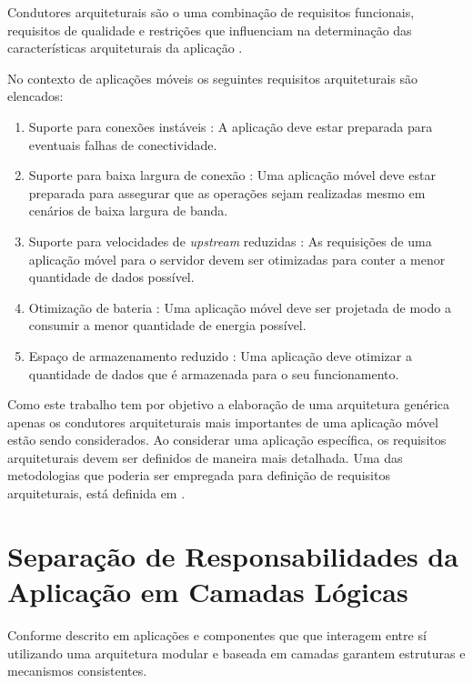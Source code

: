 \documentclass[
	article,			%
	11pt,				%
	oneside,			%
	a4paper,			%
	english,			%
	brazil,				%
	sumario=tradicional
]{abntex2}
\begin{document}
Condutores arquiteturais são o uma combinação de requisitos funcionais, requisitos de qualidade e restrições que influenciam na determinação das características arquiteturais da aplicação \cite{bachmann2001introduction}.

No contexto de aplicações móveis os seguintes requisitos arquiteturais são elencados:
\begin{enumerate}
	\item Suporte para conexões instáveis \cite{tiffany2008guide}: A aplicação deve estar preparada para eventuais falhas de conectividade.
	
	\item Suporte para baixa largura de conexão \cite{tiffany2008guide}: Uma aplicação móvel deve estar preparada para assegurar que as operações sejam realizadas mesmo em cenários de baixa largura de banda.
	
	\item Suporte para velocidades de \emph{upstream} reduzidas \cite{rathore2007overview}: As requisições de uma aplicação móvel para o servidor devem ser otimizadas para conter a menor quantidade de dados possível.
	
	\item Otimização de bateria \cite{rathore2007overview}: Uma aplicação móvel deve ser projetada de modo a consumir a menor quantidade de energia possível.
	
	\item Espaço de armazenamento reduzido \cite{tiffany2008guide}: Uma aplicação deve otimizar a quantidade de dados que é armazenada para o seu funcionamento.
	
\end{enumerate}

Como este trabalho tem por objetivo a elaboração de uma arquitetura genérica apenas os condutores arquiteturais mais importantes de uma aplicação móvel estão sendo considerados. Ao considerar uma aplicação específica, os requisitos arquiteturais devem ser definidos de maneira mais detalhada. Uma das metodologias que poderia ser empregada para definição de requisitos arquiteturais, está definida em \cite{eeles2005capturing}.

\section{Separação de Responsabilidades da Aplicação em Camadas Lógicas}

Conforme descrito em \cite{griss1998architecting} aplicações e componentes que que interagem entre sí utilizando uma arquitetura modular e baseada em camadas garantem estruturas e mecanismos consistentes.
\end{document}
